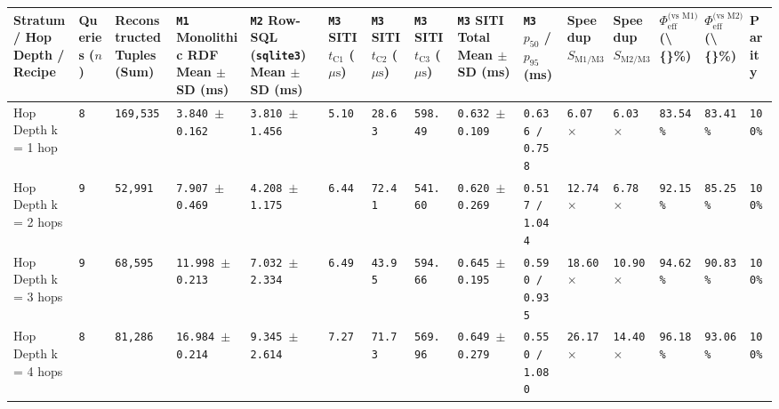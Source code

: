 \documentclass[10pt,a4paper]{article}
\begin{document}
{\scriptsize
\begin{longtable}{p{}p{}p{}p{}p{}p{}p{}p{}p{}p{}p{}p{}p{}p{}p{}}
\toprule
\textbf{Stratum / Hop Depth / Recipe} & \textbf{Queries ($n$)} & \textbf{Reconstructed Tuples (Sum)} & \textbf{\texttt{M1} Monolithic RDF Mean $\pm$ SD (ms)} & \textbf{\texttt{M2} Row-SQL (\texttt{sqlite3}) Mean $\pm$ SD (ms)} & \textbf{\texttt{M3} SITI $t_{\text{C1}}$ ($\mu\text{s}$)} & \textbf{\texttt{M3} SITI $t_{\text{C2}}$ ($\mu\text{s}$)} & \textbf{\texttt{M3} SITI $t_{\text{C3}}$ ($\mu\text{s}$)} & \textbf{\texttt{M3} SITI Total Mean $\pm$ SD (ms)} & \textbf{\texttt{M3} $p_{50}$ / $p_{95}$ (ms)} & \textbf{Speedup $S_{\text{M1/M3}}$} & \textbf{Speedup $S_{\text{M2/M3}}$} & \textbf{$\Phi_{\text{eff}}^{\text{(vs M1)}}$ (\textbackslash\{\}\%)} & \textbf{$\Phi_{\text{eff}}^{\text{(vs M2)}}$ (\textbackslash\{\}\%)} & \textbf{Parity} \\
\midrule
\endhead
Hop Depth k = 1 hop & \texttt{8} & \texttt{169,535} & \texttt{3.840 $\pm$ 0.162} & \texttt{3.810 $\pm$ 1.456} & \texttt{5.10} & \texttt{28.63} & \texttt{598.49} & \texttt{0.632 $\pm$ 0.109} & \texttt{0.636 / 0.758} & \texttt{6.07$\times$} & \texttt{6.03$\times$} & \texttt{83.54\%} & \texttt{83.41\%} & \texttt{100\%} \\
Hop Depth k = 2 hops & \texttt{9} & \texttt{52,991} & \texttt{7.907 $\pm$ 0.469} & \texttt{4.208 $\pm$ 1.175} & \texttt{6.44} & \texttt{72.41} & \texttt{541.60} & \texttt{0.620 $\pm$ 0.269} & \texttt{0.517 / 1.044} & \texttt{12.74$\times$} & \texttt{6.78$\times$} & \texttt{92.15\%} & \texttt{85.25\%} & \texttt{100\%} \\
Hop Depth k = 3 hops & \texttt{9} & \texttt{68,595} & \texttt{11.998 $\pm$ 0.213} & \texttt{7.032 $\pm$ 2.334} & \texttt{6.49} & \texttt{43.95} & \texttt{594.66} & \texttt{0.645 $\pm$ 0.195} & \texttt{0.590 / 0.935} & \texttt{18.60$\times$} & \texttt{10.90$\times$} & \texttt{94.62\%} & \texttt{90.83\%} & \texttt{100\%} \\
Hop Depth k = 4 hops & \texttt{8} & \texttt{81,286} & \texttt{16.984 $\pm$ 0.214} & \texttt{9.345 $\pm$ 2.614} & \texttt{7.27} & \texttt{71.73} & \texttt{569.96} & \texttt{0.649 $\pm$ 0.279} & \texttt{0.550 / 1.080} & \texttt{26.17$\times$} & \texttt{14.40$\times$} & \texttt{96.18\%} & \texttt{93.06\%} & \texttt{100\%} \\

\end{longtable}}
\end{document}
